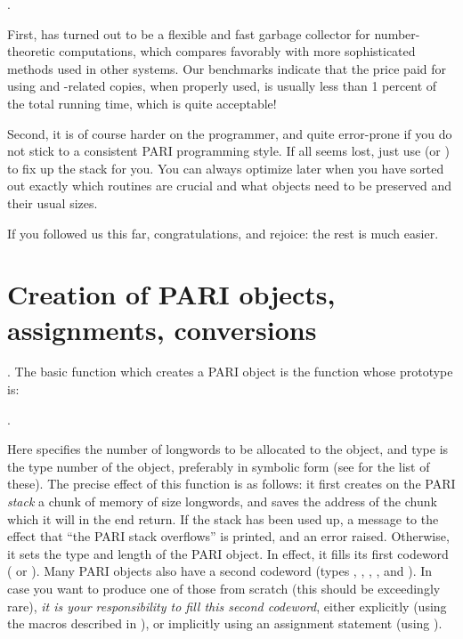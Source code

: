 .

First,  has turned out to be a flexible and fast garbage
collector for number-theoretic computations, which compares favorably with
more sophisticated methods used in other systems. Our benchmarks indicate
that the price paid for using  and -related
copies, when properly used, is usually less than 1 percent of the total
running time, which is quite acceptable!

Second, it is of course harder on the programmer, and quite error-prone
if you do not stick to a consistent PARI programming style. If all seems
lost, just use  (or ) to fix up the stack
for you. You can always optimize later when you have sorted out exactly which
routines are crucial and what objects need to be preserved and their usual
sizes.

\smallskip If you followed us this far, congratulations, and rejoice: the
rest is much easier.

\section{Creation of PARI objects, assignments, conversions}

.
The basic function which creates a PARI object is the function
 whose prototype is:

.

\noindent
Here  specifies the number of longwords to be allocated to the
object, and type is the type number of the object, preferably in symbolic
form (see  for the list of these). The precise effect of
this function is as follows: it first creates on the PARI \emph{stack} a
chunk of memory of size  longwords, and saves the address of the
chunk which it will in the end return. If the stack has been used up, a
message to the effect that ``the PARI stack overflows'' is printed,
and an error raised. Otherwise, it sets the type and length of the PARI object.
In effect, it fills its first codeword ( or ). Many PARI
objects also have a second codeword (types , ,
, , and ). In case you want to produce one of
those from scratch (this should be exceedingly rare), \emph{it is your
responsibility to fill this second codeword}, either explicitly (using the
macros described in ), or implicitly using an assignment
statement (using ).

